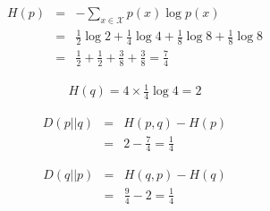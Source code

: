 \begin{questions}
\begin{solution}
\begin{parts}
        \begin{eqnarray}
        H(p) &=& - \sum_{x \in \mathcal{X}} p(x) \log p(x) \nonumber \\
                &=& \frac{1}{2} \log 2 + \frac{1}{4} \log 4 + \frac{1}{8} \log 8 + \frac{1}{8} \log 8 \nonumber \\
                &=& \frac{1}{2} + \frac{1}{2} + \frac{3}{8} + \frac{3}{8} = \frac{7}{4}
        \end{eqnarray}

        \begin{eqnarray}
        H(q) = 4 \times \frac{1}{4} \log 4 = 2
        \end{eqnarray}

        \begin{eqnarray}
        D(p||q) &=& H(p,q) - H(p) \nonumber \\
                &=& 2 - \frac{7}{4} = \frac{1}{4}
        \end{eqnarray}

        \begin{eqnarray}
        D(q||p) &=& H(q,p) - H(q) \\
                &=& \frac{9}{4} - 2 = \frac{1}{4}
        \end{eqnarray}

\end{parts}
\end{solution}
\end{questions}
